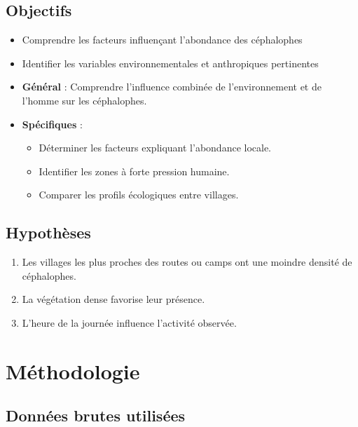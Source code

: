 \documentclass[
]{article}
\providecommand{\tightlist}{%
  \setlength{\itemsep}{0pt}\setlength{\parskip}{0pt}}
\begin{document}
\subsection{Objectifs}\label{objectifs-1}

\begin{itemize}
\item
  Comprendre les facteurs influençant l'abondance des céphalophes
\item
  Identifier les variables environnementales et anthropiques pertinentes
\item
  \textbf{Général} : Comprendre l'influence combinée de l'environnement et de l'homme sur les céphalophes.
\item
  \textbf{Spécifiques} :

  \begin{itemize}
  \tightlist
  \item
    Déterminer les facteurs expliquant l'abondance locale.
  \item
    Identifier les zones à forte pression humaine.
  \item
    Comparer les profils écologiques entre villages.
  \end{itemize}
\end{itemize}

\subsection{Hypothèses}\label{hypothuxe8ses-1}

\begin{enumerate}
\def\labelenumi{\arabic{enumi}.}
\tightlist
\item
  Les villages les plus proches des routes ou camps ont une moindre densité de céphalophes.
\item
  La végétation dense favorise leur présence.
\item
  L'heure de la journée influence l'activité observée.
\end{enumerate}

\section{Méthodologie}\label{muxe9thodologie-1}

\subsection{Données brutes utilisées}\label{donnuxe9es-brutes-utilisuxe9es-1}
\end{document}
